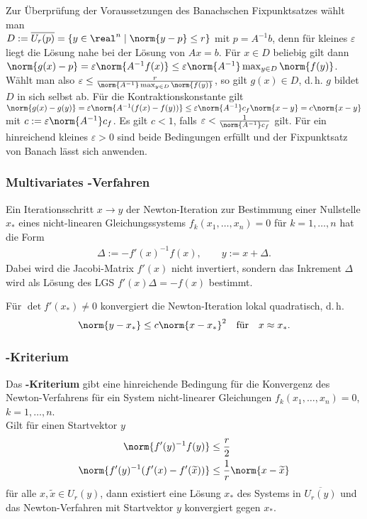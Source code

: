 Zur Überprüfung der Voraussetzungen des Banachschen Fixpunktsatzes wählt man \\
$D := \overline{U_r(p)} = \{y \in \real^n \;|\; \norm{y - p} \le r\}$
mit $p = A^{-1} b$, denn für kleines $\varepsilon$ liegt die Lösung
nahe bei der Lösung von $Ax = b$.
Für $x \in D$ beliebig gilt dann
$\norm{g(x) - p} = \varepsilon \norm{A^{-1} f(x)} \le
\varepsilon \norm{A^{-1}} \max_{y \in D} \norm{f(y)}$.
Wählt man also
$\varepsilon \le \frac{r}{\norm{A^{-1}} \max_{y \in D} \norm{f(y)}}$,
so gilt $g(x) \in D$, d.\,h. $g$ bildet $D$ in sich selbst ab.
Für die Kontraktionskonstante gilt
$\norm{g(x) - g(y)} = \varepsilon \norm{A^{-1} (f(x) - f(y))} \le
\varepsilon \norm{A^{-1}} c_f \norm{x - y} = c \norm{x - y}$
mit $c := \varepsilon \norm{A^{-1}} c_f$.
Es gilt $c < 1$, falls $\varepsilon < \frac{1}{\norm{A^{-1}} c_f}$ gilt.
Für ein hinreichend kleines $\varepsilon > 0$ sind beide Bedingungen
erfüllt und der Fixpunktsatz von Banach lässt sich anwenden.

\subsubsection{%
    Multivariates -Verfahren%
}

Ein Iterationsschritt $x \rightarrow y$ der Newton-Iteration zur Bestimmung
einer Nullstelle $x_\ast$ eines nicht-linearen Gleichungssystems
$f_k(x_1, \dotsc, x_n) = 0$ für $k = 1, \dotsc, n$ hat die Form
\begin{align*}
    \Delta := -f'(x)^{-1} f(x), \qquad
    y := x + \Delta.
\end{align*}
Dabei wird die Jacobi-Matrix $f'(x)$ nicht invertiert, sondern das Inkrement
$\Delta$ wird als Lösung des LGS $f'(x) \Delta = -f(x)$ bestimmt.

Für $\det f'(x_\ast) \not= 0$ konvergiert die Newton-Iteration lokal
quadratisch, d.\,h.
\begin{align*}
    \norm{y - x_\ast} \le c \norm{x - x_\ast}^2 \quad\text{für}\quad
    x \approx x_\ast.
\end{align*}

\subsubsection{%
    -Kriterium%
}

Das \textbf{-Kriterium} gibt eine hinreichende Bedingung
für die Konvergenz des Newton-Verfahrens für ein System nicht-linearer
Gleichungen $f_k(x_1, \dotsc, x_n) = 0$, $k = 1, \dotsc, n$. \\
Gilt für einen Startvektor $y$
\begin{align*}
    \norm{f'(y)^{-1} f(y)} & \le \frac{r}{2} \\
    \norm{f'(y)^{-1} (f'(x) - f'(\widetilde{x}))} &
    \le \frac{1}{r} \norm{x - \widetilde{x}}
\end{align*}
für alle $x, \widetilde{x} \in U_r(y)$, dann existiert eine Lösung $x_\ast$
des Systems in $\overline{U_r(y)}$ und das Newton-Verfahren mit Startvektor $y$
konvergiert gegen $x_\ast$.

